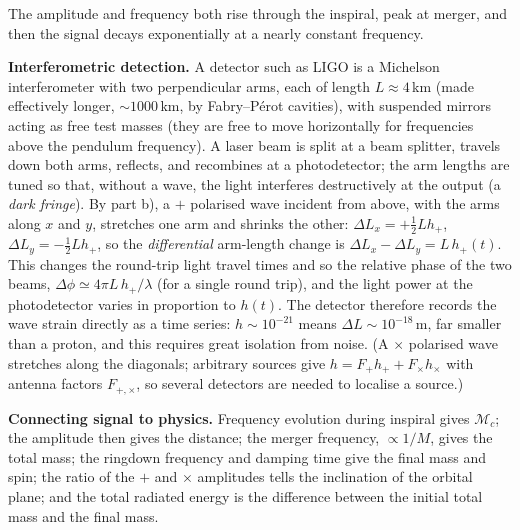 \documentclass[12pt]{article}
\begin{document}
\begin{enumerate}[label=\alph*)]
\begin{center}
\end{center}
The amplitude and frequency both rise through the inspiral, peak at merger, and then the signal decays exponentially at a nearly constant frequency.

\textbf{Interferometric detection.} A detector such as LIGO is a Michelson interferometer with two perpendicular arms, each of length $L\approx4\,$km (made effectively longer, $\sim1000$\,km, by Fabry--P\'erot cavities), with suspended mirrors acting as free test masses (they are free to move horizontally for frequencies above the pendulum frequency). A laser beam is split at a beam splitter, travels down both arms, reflects, and recombines at a photodetector; the arm lengths are tuned so that, without a wave, the light interferes destructively at the output (a \emph{dark fringe}). By part b), a $+$ polarised wave incident from above, with the arms along $x$ and $y$, stretches one arm and shrinks the other: $\Delta L_x=+\frac12Lh_+$, $\Delta L_y=-\frac12Lh_+$, so the \emph{differential} arm-length change is $\Delta L_x-\Delta L_y=L\,h_+(t)$. This changes the round-trip light travel times and so the relative phase of the two beams, $\Delta\phi\simeq 4\pi L\,h_+/\lambda$ (for a single round trip), and the light power at the photodetector varies in proportion to $h(t)$. The detector therefore records the wave strain directly as a time series: $h\sim10^{-21}$ means $\Delta L\sim10^{-18}$\,m, far smaller than a proton, and this requires great isolation from noise. (A $\times$ polarised wave stretches along the diagonals; arbitrary sources give $h=F_+h_++F_\times h_\times$ with antenna factors $F_{+,\times}$, so several detectors are needed to localise a source.)

\textbf{Connecting signal to physics.} Frequency evolution during inspiral gives $\mathcal M_c$; the amplitude then gives the distance; the merger frequency, $\propto1/M$, gives the total mass; the ringdown frequency and damping time give the final mass and spin; the ratio of the $+$ and $\times$ amplitudes tells the inclination of the orbital plane; and the total radiated energy is the difference between the initial total mass and the final mass.
\end{enumerate}
\end{document}
